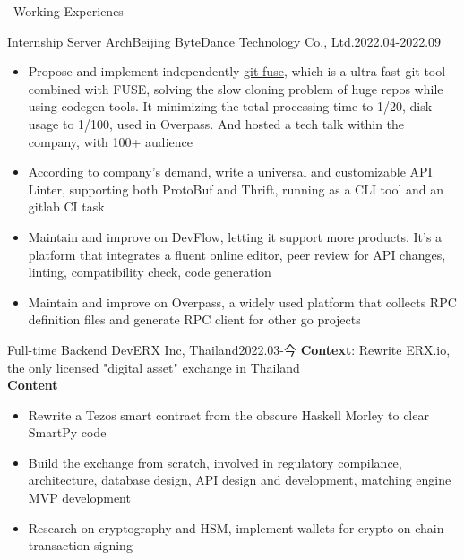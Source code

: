 \documentclass{resume}
\begin{document}
\begin{rSection}{\faUsers~Working Experienes}
    \begin{rExperience}{Internship Server Arch}{Beijing ByteDance Technology Co., Ltd.}{2022.04-2022.09}
        \begin{itemize}
            \itemsep -0.5em \vspace{-0.5em}
            \item Propose and implement independently \href{https://github.com/qiujiangkun/git-fuse}{git-fuse}, which is a ultra fast git tool combined with FUSE, solving the slow cloning problem of huge repos while using codegen tools. It minimizing the total processing time to 1/20, disk usage to 1/100, used in Overpass. And hosted a tech talk within the company, with 100+ audience
            \item According to company's demand, write a universal and customizable API Linter, supporting both ProtoBuf and Thrift, running as a CLI tool and an gitlab CI task
            \item Maintain and improve on DevFlow, letting it support more products. It's a platform that integrates a fluent online editor, peer review for API changes, linting, compatibility check, code generation
            \item Maintain and improve on Overpass, a widely used platform that collects RPC definition files and generate RPC client for other go projects
        \end{itemize}
    \end{rExperience}
    \begin{rExperience}{Full-time Backend Dev}{ERX Inc, Thailand}{2022.03-今}
        \textbf{Context}:
        Rewrite ERX.io, the only licensed "digital asset" exchange in Thailand\\
        \textbf{Content}
        \begin{itemize}
            \itemsep -0.5em \vspace{-0.5em}
            \item Rewrite a Tezos smart contract from the obscure Haskell Morley to clear SmartPy code
            \item Build the exchange from scratch, involved in regulatory compilance, architecture, database design, API design and development, matching engine MVP development
            \item Research on cryptography and HSM, implement wallets for crypto on-chain transaction signing
        \end{itemize}

\end{rExperience}
\end{rSection}
\end{document}
